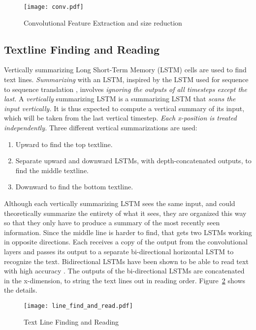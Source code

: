\documentclass[runningheads]{llncs}
\begin{document}
\begin{figure}
\centering
\vspace{-4.5cm}
\texttt{[image: conv.pdf]}
\caption{Convolutional Feature Extraction and size reduction}
\label{fig:conv}
\end{figure}

\subsection{Textline Finding and Reading}
Vertically summarizing Long Short-Term Memory (LSTM)\cite{hochreiter1997long} cells
 are used to find text lines. \textit{Summarizing} with an LSTM, inspired by the LSTM used for sequence to sequence
translation \cite{NIPS2014_5346}, involves \textit{ignoring the outputs of all timesteps except the last.}
A \textit{vertically} summarizing LSTM is a summarizing LSTM that \textit{scans
 the input vertically.} It is thus expected to
 compute a vertical summary of its input, which will be taken from the last vertical timestep.
 \textit{Each x-position is treated independently.}
 Three different vertical summarizations are used:
\begin{enumerate}
\item Upward to find the top textline.
\item Separate upward and downward LSTMs, with depth-concatenated outputs, to find the middle textline.
\item Downward to find the bottom textline.
\end{enumerate}
Although each vertically summarizing LSTM sees the same input, and could theoretically
 summarize the entirety of what it sees, they are organized this way so that they only have to produce
 a summary of the most recently seen information. Since the middle line is harder to find, that gets
 two LSTMs working in opposite directions. Each receives a copy of the output from the convolutional
 layers and passes its output to a separate bi-directional horizontal LSTM to recognize the text.
 Bidirectional LSTMs have been shown to be able to read text with high
 accuracy \cite{breuel2013high}.
 The outputs of the bi-directional LSTMs are concatenated in the x-dimension, to string the text
 lines out in reading order. Figure~\ref{fig:line_find_and_read} shows the details.

\begin{figure}
\centering
\vspace{-1cm}
\texttt{[image: line\_find\_and\_read.pdf]}
\caption{Text Line Finding and Reading}
\label{fig:line_find_and_read}
\end{figure}
\end{document}
